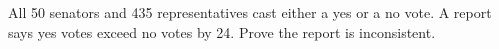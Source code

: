 All 50 senators and 435 representatives cast either a yes or a no vote. A report says yes votes exceed no votes by 24. Prove the report is inconsistent.

